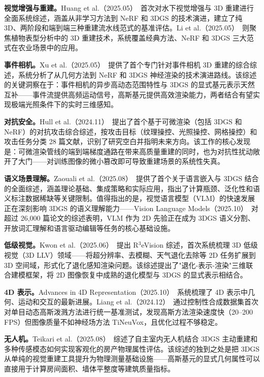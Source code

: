 \textbf{视觉增强与重建。}Huang et al.（2025.05）~\cite{2505_01869}首次对水下视觉增强与 3D 重建进行全面系统综述，涵盖从非学习方法到 NeRF 和 3DGS 的技术演进，建立了纯 3D、两阶段和端到端三种重建流水线范式的基准评估。Li et al.（2025.05）~\cite{2505_00737}则聚焦植物表型分析中的 3D 重建技术，系统覆盖经典方法、NeRF 和 3DGS 三大范式在农业场景中的应用。

\textbf{事件相机。}Xu et al.（2025.05）~\cite{2505_08438}提供了首个专门针对事件相机 3D 重建的综合综述，系统分析了从几何方法到 NeRF 和 3DGS 神经渲染的技术演进路线。该综述的关键洞察在于：事件相机的异步高动态范围特性与 3DGS 的显式基元表示天然互补——事件流提供高频运动信号，高斯基元提供高效渲染能力，两者结合有望实现极端光照条件下的实时三维感知。

\textbf{对抗安全。}Hull et al.（2024.11）~\cite{2411_09749}提出了首个基于可微渲染（包括 3DGS 和 NeRF）的对抗攻击综合综述，按攻击目标（纹理操控、光照操控、网格操控）和攻击任务分类 28 篇文献，识别了研究空白并指明未来方向。该工作的核心发现是：可微渲染管线的端到端梯度通路在带来高质量重建的同时，也为对抗性扰动敞开了大门——对训练图像的微小篡改即可导致重建场景的系统性失真。

\textbf{语义场景理解。}Zaouali et al.（2025.08）~\cite{2508_05064}提供了首个关于语言嵌入与 3DGS 结合的全面综述，涵盖理论基础、集成策略和实际应用，指出了计算瓶颈、泛化性和语义标注数据稀缺等关键限制。值得指出的是，视觉语言模型（VLM）的快速发展正在深刻影响 3DGS 的语义理解能力——Vision Language Models（2025.10）~\cite{2510_09586}对超过 26,000 篇论文的综述表明，VLM 作为 2D 先验正在成为 3DGS 语义分割、开放词汇理解和语言驱动编辑等任务的核心基础设施。

\textbf{低级视觉。}Kwon et al.（2025.06）~\cite{2506_16262}提出 R$^3$eVision 综述，首次系统梳理 3D 低级视觉（3D LLV）领域——将超分辨率、去模糊、天气退化去除等 2D 任务扩展到 3D 空间域，形式化了退化感知渲染问题。该综述提出了"退化-表示-渲染"三维联合建模框架，将 2D 图像恢复中成熟的退化模型与 3DGS 的显式表示相结合。

\textbf{4D 表示。}Advances in 4D Representation（2025.10）~\cite{2510_19255}系统梳理了 4D 表示中几何、运动和交互的最新进展。Liang et al.（2024.12）~\cite{2412_04457}通过控制性合成数据集首次对单目动态高斯泼溅方法进行统一基准测试，发现高斯方法渲染速度快（20--200 FPS）但图像质量不如神经场方法 TiNeuVox，且优化过程不够稳定。

\textbf{无人机。}Teikari et al.（2025.08）~\cite{2508_01965}综述了自主室内无人机结合 3DGS 主动重建和多种传感模态如何实现客观化的房产物理属性评估。该综述的独到之处是把 3DGS 从单纯的视觉重建工具提升为物理测量基础设施——高斯基元的显式几何属性可以直接用于计算房间面积、墙体平整度等建筑质量指标。

